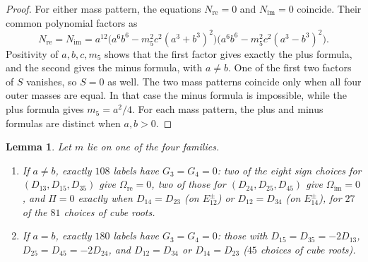 \documentclass[11pt]{amsart}
\newenvironment{alphalist}{\begin{enumerate}\renewcommand{\labelenumi}{(\alph{enumi})}%
  \renewcommand{\theenumi}{\alph{enumi}}}{\end{enumerate}}
\newtheorem{lemma}[theorem]{Lemma}
\theoremstyle{definition}
\theoremstyle{remark}
\begin{document}
{\begin{proof}
For either mass pattern, the equations $N_{\mathrm{re}}=0$ and
$N_{\mathrm{im}}=0$ coincide. Their common polynomial factors as
\[
 N_{\mathrm{re}}=N_{\mathrm{im}}
 =a^{12}\bigl(a^6b^6-m_5^2c^2(a^3+b^3)^2\bigr)
          \bigl(a^6b^6-m_5^2c^2(a^3-b^3)^2\bigr).
\]
Positivity of $a,b,c,m_5$ shows that the first factor gives exactly the plus
formula, and the second gives the minus formula, with $a\ne b$.
One of the first two factors of $S$ vanishes, so $S=0$ as well.
The two mass patterns coincide only when all four outer masses are equal.
In that case the minus formula is impossible, while the plus formula gives $m_5=a^2/4$.
For each mass pattern, the plus and minus formulas are distinct when $a,b>0$.
\end{proof}

\begin{lemma}\label{lem:d3-census}
Let $m$ lie on one of the four families.
\begin{alphalist}
  \item If $a\ne b$, exactly $108$ labels have $G_3=G_4=0$: two of the eight sign choices for
  $(D_{13},D_{15},D_{35})$ give $\Omega_{\mathrm{re}}=0$, two of those for $(D_{24},D_{25},D_{45})$
  give $\Omega_{\mathrm{im}}=0$, and $\Pi=0$ exactly when $D_{14}=D_{23}$ (on $E^\pm_{12}$) or
  $D_{12}=D_{34}$ (on $E^\pm_{14}$), for $27$ of the $81$ choices of cube roots.
  \item If $a=b$, exactly $180$ labels have $G_3=G_4=0$: those with $D_{15}=D_{35}=-2D_{13}$,
  $D_{25}=D_{45}=-2D_{24}$, and $D_{12}=D_{34}$ or $D_{14}=D_{23}$ ($45$ choices of cube roots).
\end{alphalist}
\end{lemma}}
\end{document}
